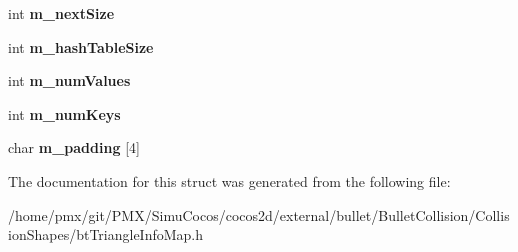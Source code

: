 \begin{DoxyCompactItemize}
int {\bfseries m\+\_\+next\+Size}
\item 
\mbox{\label{structbtTriangleInfoMapData_a4237db38388cc48e1ca544710bc71c05}} 
int {\bfseries m\+\_\+hash\+Table\+Size}
\item 
\mbox{\label{structbtTriangleInfoMapData_acdc8fc834822353be510f465ac6d1e99}} 
int {\bfseries m\+\_\+num\+Values}
\item 
\mbox{\label{structbtTriangleInfoMapData_a9b83f5637b8c46f17b2ab2067beb6066}} 
int {\bfseries m\+\_\+num\+Keys}
\item 
\mbox{\label{structbtTriangleInfoMapData_a9c4c635c73d467db5eea11266899a100}} 
char {\bfseries m\+\_\+padding} \mbox{[}4\mbox{]}
\end{DoxyCompactItemize}


The documentation for this struct was generated from the following file\+:\begin{DoxyCompactItemize}
\item 
/home/pmx/git/\+P\+M\+X/\+Simu\+Cocos/cocos2d/external/bullet/\+Bullet\+Collision/\+Collision\+Shapes/bt\+Triangle\+Info\+Map.\+h\end{DoxyCompactItemize}
